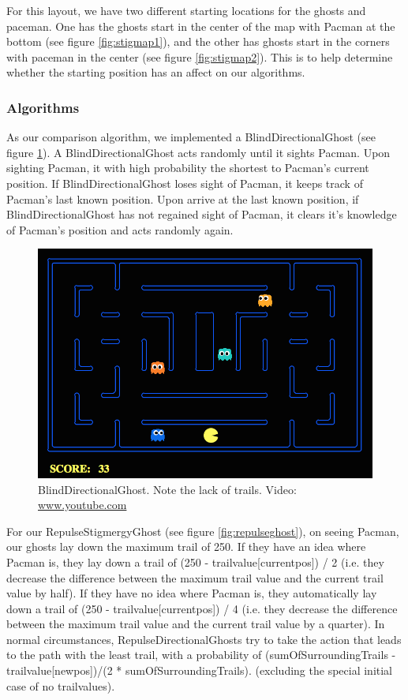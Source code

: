 \documentclass[11pt]{article}
\begin{document}
\begin{multicols}{2}
For this layout, we have two different starting locations for the ghosts and paceman.  One has the ghosts start in the center of the map with Pacman at the bottom (see figure \ref{fig:stigmap1}), and the other has ghosts start in the corners with paceman in the center (see figure \ref{fig:stigmap2}).  This is to help determine whether the starting position has an affect on our algorithms.




\subsubsection{Algorithms}

As our comparison algorithm, we implemented a BlindDirectionalGhost (see figure \ref{fig:blindghost}). A BlindDirectionalGhost acts randomly until it sights Pacman.  Upon sighting Pacman, it with high probability the shortest to Pacman's current position.  If BlindDirectionalGhost loses sight of Pacman, it keeps track of Pacman's last known position.  Upon arrive at the last known position, if BlindDirectionalGhost has not regained sight of Pacman, it clears it's knowledge of Pacman's position and acts randomly again.
\begin{figure}[H]
	\includegraphics[width=\columnwidth]{BlindDirectionalGhost.png}
	\caption{BlindDirectionalGhost. Note the lack of trails.
	Video: \protect\url{www.youtube.com} }

	\label{fig:blindghost}
\end{figure}

For our RepulseStigmergyGhost  (see figure \ref{fig:repulseghost}), on seeing Pacman, our ghosts lay down the maximum trail of 250.  If they have an idea where Pacman is, they lay down a trail of (250 - trailvalue[currentpos]) / 2 (i.e. they decrease the difference between the maximum trail value and the current trail value by half).   If they have no idea where Pacman is, they automatically lay down a trail of (250 - trailvalue[currentpos]) / 4 (i.e. they decrease the difference between the maximum trail value and the current trail value by a quarter). In normal circumstances, RepulseDirectionalGhosts try to take the action that leads to the path with the least trail, with a probability of (sumOfSurroundingTrails - trailvalue[newpos])/(2 * sumOfSurroundingTrails). (excluding the special initial case of no trailvalues).


\end{multicols}
\end{document}
